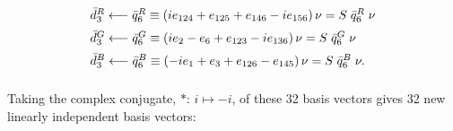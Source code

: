 \documentclass[letterpaper,12pt,titlepage,oneside,final]{book}
\newcommand{\spacer}{0.2cm}
\begin{document}
\begin{equation}\begin{array}{l}\label{newtriplet6}
\bar{d}_3^R\longleftarrow \bar{q}^R_{6}\equiv\left(ie_{124}+e_{125}+e_{146}-ie_{156}\right)\nu =S\hspace{1mm}\bar{q}^R_{6}\hspace{1mm}\nu  \vspace{\spacer} \\
\bar{d}_3^G\longleftarrow \bar{q}^G_{6}\equiv\left(ie_{2}-e_{6}+e_{123}-ie_{136}\right)\nu=S\hspace{1mm}\bar{q}^G_{6}\hspace{1mm}\nu    \vspace{\spacer} \\
\bar{d}_3^B\longleftarrow \bar{q}^B_{6}\equiv\left(-ie_{1}+e_{3}+e_{126}-e_{145}\right)\nu=S\hspace{1mm}\bar{q}^B_{6}\hspace{1mm}\nu .   \vspace{\spacer} \\
\end{array}\end{equation}

Taking the complex conjugate, $*$: $i\mapsto-i$, of these 32 basis vectors gives 32 new linearly independent basis vectors:
\end{document}
